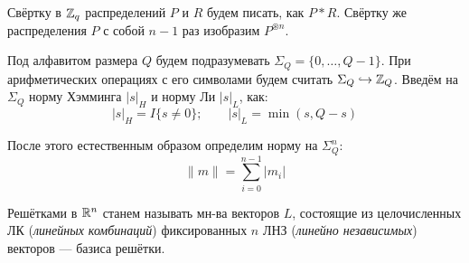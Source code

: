 Свёртку в $\mathbb{Z}_q$ распределений $P$ и $R$ будем писать, как $P * R$. Свёртку же распределения $P$ с собой $n-1$ раз изобразим $P^{\circledast n}$.

Под алфавитом размера $Q$ будем подразумевать $\Sigma_Q = \{0, \ldots, Q-1\}$. При арифметических операциях с его символами будем считать $\Sigma_Q \hookrightarrow \mathbb{Z}_Q$. Введём на $\Sigma_Q$ норму Хэмминга $|s|_H$ и норму Ли $|s|_L$, как:
\begin{equation}
	|s|_H = I\{s \neq 0\}; \qquad |s|_L = \min(s, Q-s)
\end{equation}

После этого естественным образом определим норму на $\Sigma_Q^n$:
\begin{equation}
	\|m\| = \sum_{i=0}^{n-1}{|m_i|}
\end{equation}

Решётками в $\mathbb{R}^n$ станем называть мн-ва векторов $L$, состоящие из целочисленных ЛК ({\it линейных комбинаций}) фиксированных $n$ ЛНЗ ({\it линейно независимых}) векторов --- базиса решётки.
